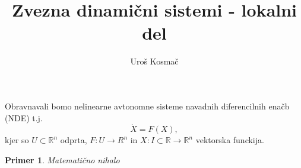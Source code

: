 \documentclass{article}
\title{Zvezna dinamični sistemi - lokalni del}
\author{Uroš Kosmač}
\newtheorem{primer}{Primer}
\newcommand{\R}{\mathbb{R}}
\begin{document}
\maketitle

Obravnavali bomo nelinearne avtonomne sisteme navadnih diferencilnih enačb (NDE)
t.j. 
\begin{equation}
\dot{X} = F(X),
\end{equation}
kjer so $U \subset \R^n$ odprta, $F:U \rightarrow R^n$ in $X: I \subset \R \rightarrow \R^n$
vektorska funckija. 

\begin{primer}
Matematično nihalo
\begin{center}
\end{center}
\end{primer}
\end{document}
